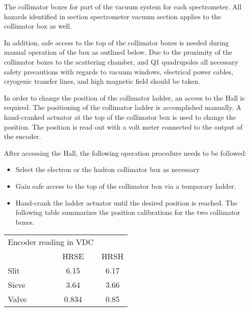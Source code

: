 The collimator boxes for part of the vacuum system for each spectrometer. All hazards
identified in section spectrometer vacuum section applies to the collimator box as well.

In addition, safe access to the top of
the collimator boxes is needed  during manual operation of the box as outlined below.
Due to the proximity of the collimator boxes to the scattering chamber, and Q1 quadrupoles
all necessary safety precautions with regards to vacuum windows, electrical power cables, 
cryogenic transfer lines, and high magnetic field should be taken.

In order to change the  position of the collimator ladder, an access to the Hall is
required. The positioning of the collimator ladder is accomplished manually.
A hand-cranked actuator at the top of the collimator box is used to change the position.
The position is read out with a volt meter connected to the output of the encoder.

After accessing the Hall, the following operation procedure needs to be followed:
\begin{itemize}
\item[~] Select the electron or the hadron collimator box as necessary
\item[~] Gain safe access to the top of the collimator box via a temporary ladder.
\item[~] Hand-crank the  ladder actuator until the desired position is reached. The
following table summarizes the position calibrations for the two collimator boxes.
\end{itemize}
\begin{tabular}{|l | c| c|}
\hline
\multicolumn{2}{|c|}{Encoder reading in VDC} & \\
 & HRSE & HRSH \\
 \hline
 Slit & 6.15 & 6.17 \\ \hline
 Sieve & 3.64 & 3.66 \\ \hline
 Valve & 0.834 & 0.85 \\ 
 \hline
 \end{tabular}
\vfill\eject
